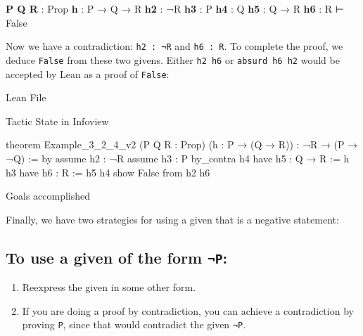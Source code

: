 \documentclass[
  letterpaper,
  DIV=11,
  numbers=noendperiod]{scrreprt}
\newenvironment{Shaded}{\begin{snugshade}}{\end{snugshade}}
\newcommand{\InformationTok}[1]{\textcolor[rgb]{0.37,0.37,0.37}{#1}}
\newcommand{\KeywordTok}[1]{\textcolor[rgb]{0.00,0.23,0.31}{#1}}
\newcommand{\NormalTok}[1]{\textcolor[rgb]{0.00,0.23,0.31}{#1}}
\newcommand{\SpecialCharTok}[1]{\textcolor[rgb]{0.37,0.37,0.37}{#1}}
\providecommand{\tightlist}{%
  \setlength{\itemsep}{0pt}\setlength{\parskip}{0pt}}\usepackage{longtable,booktabs,array}
\renewcommand{\KeywordTok}[1]{\textcolor[HTML]{0000FF}{#1}}
\renewcommand{\SpecialCharTok}[1]{}
\renewcommand{\InformationTok}[1]{\textcolor[HTML]{D2691E}{\textbf{#1}}}
\begin{document}
\begin{Shaded}
\begin{Highlighting}[]
\InformationTok{P Q R }\NormalTok{: Prop}
\InformationTok{h }\NormalTok{: P → Q → R}
\InformationTok{h2 }\NormalTok{: ¬R}
\InformationTok{h3 }\NormalTok{: P}
\InformationTok{h4 }\NormalTok{: Q}
\InformationTok{h5 }\NormalTok{: Q → R}
\InformationTok{h6 }\NormalTok{: R}
\NormalTok{⊢ False}
\end{Highlighting}
\end{Shaded}

Now we have a contradiction: \texttt{h2\ :\ ¬R} and \texttt{h6\ :\ R}.
To complete the proof, we deduce \texttt{False} from these two givens.
Either \texttt{h2\ h6} or \texttt{absurd\ h6\ h2} would be accepted by
Lean as a proof of \texttt{False}:

Lean File

Tactic State in Infoview

\begin{Shaded}
\begin{Highlighting}[]
\KeywordTok{theorem}\NormalTok{ Example\_3\_2\_4\_v2 (P Q R : }\KeywordTok{Prop}\NormalTok{)}
\NormalTok{(h : P → (Q → R)) : ¬R → (P → ¬Q) := }\KeywordTok{by}
  \KeywordTok{assume}\NormalTok{ h2 : ¬R}
  \KeywordTok{assume}\NormalTok{ h3 : P}
  \KeywordTok{by\_contra}\NormalTok{ h4}
  \KeywordTok{have}\NormalTok{ h5 : Q → R := h h3}
  \KeywordTok{have}\NormalTok{ h6 : R := h5 h4}
  \KeywordTok{show}\NormalTok{ False }\KeywordTok{from}\NormalTok{ h2 h6}
\end{Highlighting}
\end{Shaded}

\begin{Shaded}
\begin{Highlighting}[]
\SpecialCharTok{{-}}\NormalTok{Goals accomplished 🎉}
\end{Highlighting}
\end{Shaded}

Finally, we have two strategies for using a given that is a negative
statement:

\hypertarget{to-use-a-given-of-the-form-p}{%
\subsection{\texorpdfstring{To use a given of the form
\texttt{¬P}:}{To use a given of the form ¬P:}}\label{to-use-a-given-of-the-form-p}}

\begin{enumerate}
\def\labelenumi{\arabic{enumi}.}
\tightlist
\item
  Reexpress the given in some other form.
\item
  If you are doing a proof by contradiction, you can achieve a
  contradiction by proving \texttt{P}, since that would contradict the
  given \texttt{¬P}.
\end{enumerate}
\end{document}

